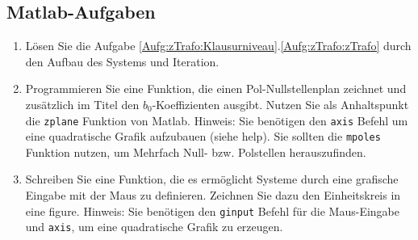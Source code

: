 {
\subsection{Matlab-Aufgaben}
\begin{enumerate}
    \item Lösen Sie die Aufgabe \ref{Aufg:zTrafo:Klausurniveau}.\ref{Aufg:zTrafo:zTrafo} durch
    den Aufbau des Systems und Iteration.
    \item Programmieren Sie eine Funktion, die einen Pol-Nullstellenplan zeichnet und zusätzlich im
    Titel den $b_0$-Koeffizienten ausgibt. Nutzen Sie als Anhaltspunkt die {\tt zplane} Funktion von Matlab.
    Hinweis: Sie benötigen den {\tt axis} Befehl um eine quadratische Grafik aufzubauen (siehe help).
    Sie sollten die {\tt mpoles} Funktion nutzen, um Mehrfach Null- bzw. Polstellen herauszufinden.
    \item Schreiben Sie eine Funktion, die es ermöglicht Systeme durch eine grafische Eingabe mit der Maus
    zu definieren. Zeichnen Sie dazu den Einheitskreis in eine figure. Hinweis: Sie benötigen den
    {\tt ginput} Befehl für die Maus-Eingabe und {\tt axis}, um eine quadratische Grafik zu erzeugen.
\end{enumerate}
}
